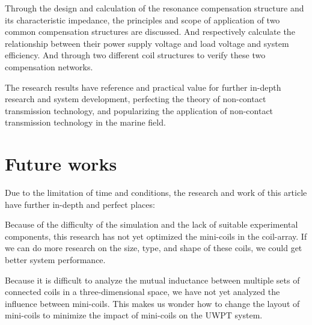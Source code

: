 Through the design and calculation of the resonance compensation structure and its characteristic impedance, the principles and scope of application of two common compensation structures are discussed.
And respectively calculate the relationship between their power supply voltage and load voltage and system efficiency.
And through two different coil structures to verify these two compensation networks.

The research results have reference and practical value for further in-depth research and system development, perfecting the theory of non-contact transmission technology, and popularizing the application of non-contact transmission technology in the marine field.

\section{Future works}
Due to the limitation of time and conditions, the research and work of this article have further in-depth and perfect places:

Because of the difficulty of the simulation and the lack of suitable experimental components, this research has not yet optimized the mini-coils in the coil-array. If we can do more research on the size, type, and shape of these coils, we could get better system performance.

Because it is difficult to analyze the mutual inductance between multiple sets of connected coils in a three-dimensional space, we have not yet analyzed the influence between mini-coils.
This makes us wonder how to change the layout of mini-coils to minimize the impact of mini-coils on the UWPT system.




